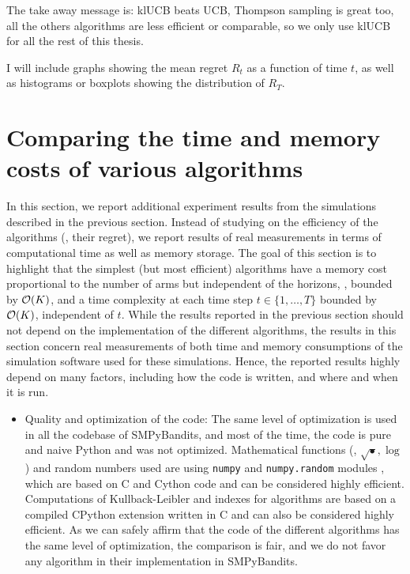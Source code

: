 {The take away message is: klUCB beats UCB, Thompson sampling is great too, all the others algorithms are less efficient or comparable, so we only use klUCB for all the rest of this thesis.

I will include graphs showing the mean regret $R_t$ as a function of time $t$, as well as histograms or boxplots showing the distribution of $R_T$.


\section{Comparing the time and memory costs of various algorithms}
\label{sec:3:timeAndMemoryCosts}


In this section, we report additional experiment results from the simulations described in the previous section.
Instead of studying on the efficiency of the algorithms (\ie, their regret), we report results of real measurements in terms of computational time as well as memory storage.
%
The goal of this section is to highlight that the simplest (but most efficient) algorithms have a memory cost proportional to the number of arms but independent of the horizons, \ie, bounded by $\mathop{}\mathopen{}\mathcal{O}\mathopen{}\left(K\right)$, and a time complexity at each time step $t\in\{1,\dots,T\}$ bounded by $\mathop{}\mathopen{}\mathcal{O}\mathopen{}\left(K\right)$, independent of $t$.
%
While the results reported in the previous section should not depend on the implementation of the different algorithms, the results in this section concern real measurements of both time and memory consumptions of the simulation software used for these simulations.
Hence, the reported results highly depend on many factors, including how the code is written, and where and when it is run.

\begin{itemize}
    \item Quality and optimization of the code:
    The same level of optimization is used in all the codebase of SMPyBandits, and most of the time, the code is pure and naive Python and was not optimized.
    Mathematical functions (\eg, $\sqrt{\bullet}, \log$) and random numbers used are using \texttt{numpy} and \texttt{numpy.random} modules \cite{numpy}, which are based on C and Cython code and can be considered highly efficient.
    Computations of Kullback-Leibler and indexes for \klUCB{} algorithms are based on a compiled CPython extension written in C and can also be considered highly efficient.
    As we can safely affirm that the code of the different algorithms has the same level of optimization, the comparison is fair, and we do not favor any algorithm in their implementation in SMPyBandits.


\end{itemize}}
